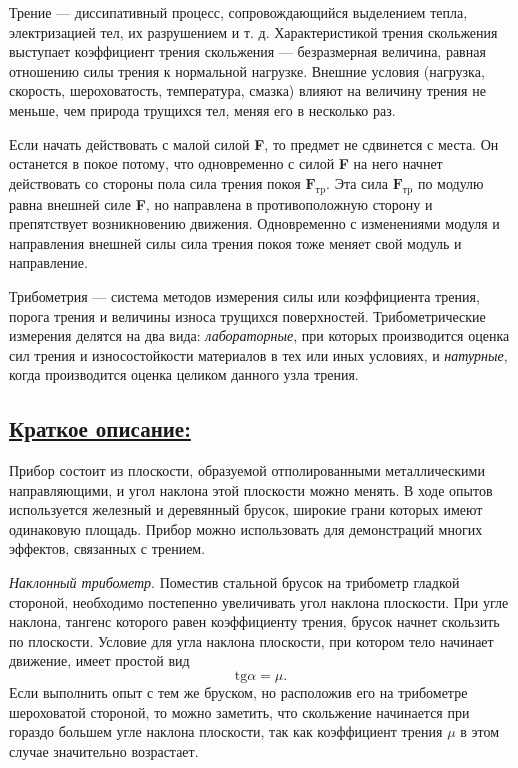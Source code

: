 \documentclass[14pt,a4paper,oneside]{extarticle}	%
\begin{document}
	Трение — диссипативный процесс, 
	сопровождающийся выделением тепла, электризацией тел, их разрушением и т. д. 
	Характеристикой трения скольжения выступает коэффициент трения 
	скольжения — безразмерная величина, равная отношению силы трения к нормальной нагрузке.
	Внешние условия (нагрузка, скорость, 
	 шероховатость, температура, смазка) влияют на величину 
	 трения не меньше, чем природа трущихся тел, меняя его в несколько раз.
	
	Если начать действовать с малой силой \textbf{F}, то предмет не сдвинется с места. 
	Он останется в покое потому, что одновременно с силой \textbf{F} на него начнет действовать со 
	стороны пола сила трения покоя $ \textbf{F}_{\text{тp}} $.
	Эта сила $ \textbf{F}_{\text{тp}} $ по модулю равна внешней силе \textbf{F}, но направлена в противоположную сторону и препятствует 	возникновению движения.
	Одновременно с изменениями модуля и направления внешней силы сила трения покоя тоже меняет свой 
	модуль и направление. 	
	
	Трибометрия — система методов измерения силы или 
	коэффициента трения, порога трения и величины износа трущихся поверхностей. 
	Трибометрические измерения делятся на два вида: 
	\textit{лабораторные}, при которых производится оценка сил трения и износостойкости материалов 
	в тех или иных условиях, и \textit{натурные}, когда производится оценка целиком данного узла трения.

	\subsection*{\underline{Краткое описание:}}
	
	Прибор состоит из плоскости, образуемой отполированными металлическими направляющими, и угол наклона этой плоскости можно менять.
	В ходе опытов используется железный и деревянный брусок, широкие грани которых имеют одинаковую площадь.
	Прибор можно использовать для демонстраций многих эффектов, связанных с трением.
	
	\textit{Наклонный трибометр}.	
	Поместив стальной брусок на трибометр гладкой стороной, необходимо постепенно увеличивать угол наклона плоскости.
	При угле наклона, тангенс которого равен коэффициенту трения, брусок начнет скользить по плоскости.
	Условие для угла наклона плоскости, при котором тело начинает движение, имеет простой вид
		 $$ \text{tg}\alpha=\mu. $$
	Если выполнить опыт с тем же бруском, но расположив его на трибометре шероховатой стороной, 
	то можно заметить, что скольжение начинается при гораздо большем угле наклона плоскости, 
	так как коэффициент трения $  \mu $ в этом случае значительно возрастает.
	
\end{document}
